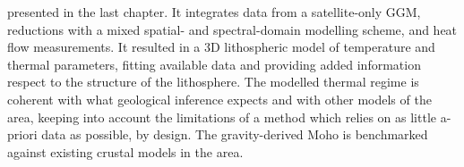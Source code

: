 presented in the last chapter. It integrates data from a satellite-only GGM, reductions with a mixed spatial- and spectral-domain modelling scheme, and heat flow measurements. It resulted in a 3D lithospheric model of temperature and thermal parameters, fitting available data and providing added information respect to the structure of the lithosphere. The modelled thermal regime is coherent with what geological inference expects and with other models of the area, keeping into account the limitations of a method which relies on as little a-priori data as possible, by design. The gravity-derived Moho is benchmarked against existing crustal models in the area.
